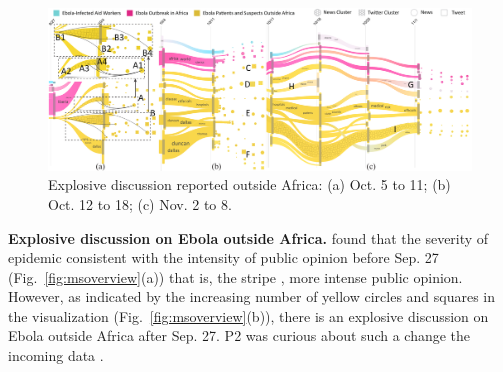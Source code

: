 \begin{figure}[t]
	\centering
	\vspace{-2mm}
	\centering
	\includegraphics[width=\linewidth]{fig/ebola}
	\vspace{-3mm}
	\caption{
		Explosive discussion  reported  outside Africa: (a) Oct. 5 to 11; (b) Oct. 12 to 18; (c) Nov. 2 to 8.
	}
	\vspace{-5mm}
	\label{fig:ebola}
\end{figure}

\noindent \textbf{\normalsize Explosive discussion on Ebola outside Africa.}
 found that the severity of  epidemic  consistent with the intensity of public opinion before Sep. 27 (Fig.~\ref{fig:msoverview}(a))\kg{,}
that is, the stripe ,  more intense public opinion.
However, as indicated by the increasing number of yellow circles and squares in the visualization (Fig.~\ref{fig:msoverview}(b)), there is an explosive discussion on Ebola outside Africa  after Sep. 27.
P2 was curious about such a change\kg{;}  the incoming data .


